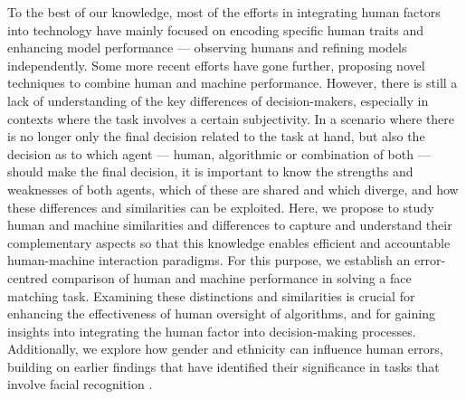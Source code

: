 \bigskip
To the best of our knowledge, most of the efforts in integrating human factors into technology have mainly focused on encoding specific human traits and enhancing model performance — observing humans and refining models independently. Some more recent efforts have gone further, proposing novel techniques to combine human and machine performance. However, there is still a lack of understanding of the key differences of decision-makers, especially in contexts where the task involves a certain subjectivity. In a scenario where there is no longer only the final decision related to the task at hand, but also the decision as to which agent — human, algorithmic or combination of both — should make the final decision, it is important to know the strengths and weaknesses of both agents, which of these are shared and which diverge, and how these differences and similarities can be exploited. Here, we propose to study human and machine similarities and differences to capture and understand their complementary aspects so that this knowledge enables efficient and accountable human-machine interaction paradigms.
%
For this purpose, we establish an error-centred comparison of human and machine performance in solving a face matching task. Examining these distinctions and similarities is crucial for enhancing the effectiveness of human oversight of algorithms, and for gaining insights into integrating the human factor into decision-making processes. Additionally, we explore how gender and ethnicity can influence human errors, building on earlier findings that have identified their significance in tasks that involve facial recognition \cite{phillips2011other,wright2003own}.